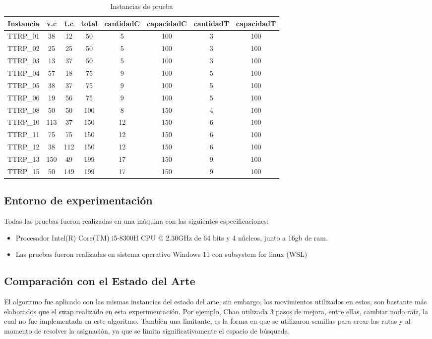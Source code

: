 \documentclass[letter, 10pt]{article}
\begin{document}
\begin{table}[h!]
\begin{center}
\begin{tabular}{ |c|c|c|c|c|c|c|c| } 
 \hline
 Instancia & v.c & t.c &total& cantidadC & capacidadC & cantidadT & capacidadT \\
 \hline
 TTRP\_01 & 38 & 12 &50& 5 & 100 & 3 & 100 \\
 \hline
 TTRP\_02 & 25 & 25 &50& 5 & 100 & 3 & 100 \\
 \hline
 TTRP\_03 & 13 & 37 &50& 5 & 100 & 3 & 100 \\
 \hline
 TTRP\_04 & 57 & 18 &75& 9 & 100 & 5 & 100 \\
 \hline
 TTRP\_05 & 38 & 37 &75& 9 & 100 & 5 & 100 \\
 \hline
 TTRP\_06 & 19 & 56 &75& 9 & 100 & 5 & 100 \\
 \hline
 TTRP\_08 & 50 & 50 &100& 8 & 150 & 4 & 100 \\
 \hline
 TTRP\_10 & 113 & 37 &150& 12 & 150 & 6 & 100 \\
 \hline
 TTRP\_11 & 75 & 75 &150& 12 & 150 & 6 & 100 \\
 \hline
 TTRP\_12 & 38 & 112 &150& 12 & 150 & 6 & 100 \\
 \hline
 TTRP\_13 & 150 & 49 &199& 17 & 150 & 9 & 100 \\
 \hline
 TTRP\_15 & 50 & 149&199 & 17 & 150 & 9 & 100 \\
 \hline
\end{tabular}
\caption{Instancias de prueba}
\label{table:1}
\end{center}
\end{table}
\subsection{Entorno de experimentación}
Todas las pruebas fueron realizadas en una máquina con las siguientes especificaciones:
\begin{itemize}
    \item Procesador Intel(R) Core(TM) i5-8300H CPU @ 2.30GHz de 64 bits y 4 núcleos, junto a 16gb de ram.
    \item Las pruebas fueron realizadas en sistema operativo Windows 11 con subsystem for linux (WSL)
\end{itemize}
\subsection{Comparación con el Estado del Arte}
El algoritmo fue aplicado con las mismas instancias del estado del arte, sin embargo, los movimientos utilizados en estos, son bastante más elaborados que el swap realizado en esta experimentación. Por ejemplo, Chao \cite{Chao} utilizada 3 pasos de mejora, entre ellas, cambiar nodo raíz, la cual no fue implementada en este algoritmo. También una limitante, es la forma en que se utilizaron semillas para crear las rutas y al momento de resolver la asignación, ya que se limita significativamente el espacio de búsqueda.
\end{document}
